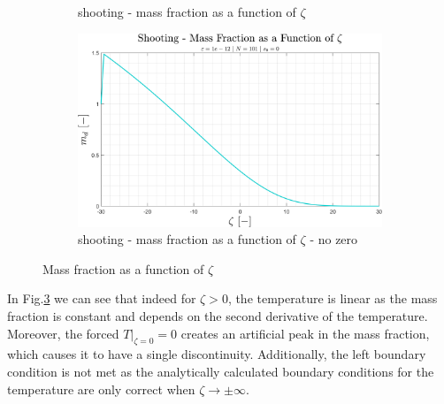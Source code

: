 \documentclass[11pt, a4paper]{article}
\begin{document}
\begin{figure}[H]
\begin{subfigure}[c]{0.49\textwidth}
        \caption{shooting - mass fraction as a function of $\zeta$}
        \label{fig: shooting - md vs zeta}
    \end{subfigure}
    \begin{subfigure}[c]{0.55\textwidth}
        \centering
        \includegraphics[width=\textwidth]{images/shooting - md vs zeta - no zero.png}
        \caption{shooting - mass fraction as a function of $\zeta$ - no zero}
        \label{fig: shooting - md vs zeta - no zero}
    \end{subfigure}
    \caption{Mass fraction as a function of $\zeta$}
    \label{fig: md vs zeta}
\end{figure}
\noindent In Fig.\ref{fig: md vs zeta} we can see that indeed for $\zeta>0$, the temperature is linear as the mass fraction is constant and depends on the second derivative of the temperature. Moreover, the forced $\left.T\right|_{\zeta=0}=0$ creates an artificial peak in the mass fraction, which causes it to have a single discontinuity. Additionally, the left boundary condition is not met as the analytically calculated boundary conditions for the temperature are only correct when $\zeta\rightarrow\pm\infty$.
\end{document}
